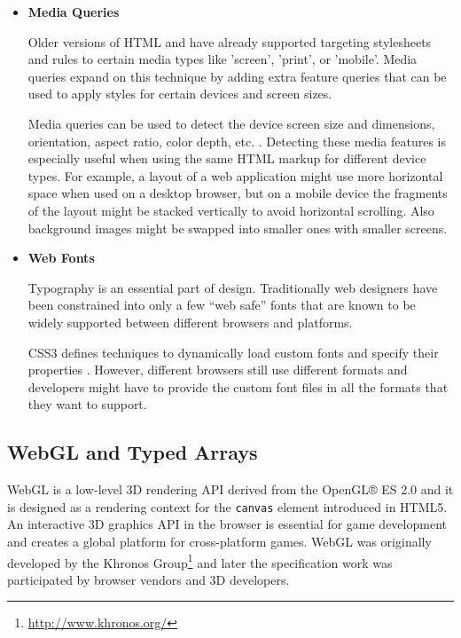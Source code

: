 \begin{itemize}
\item \textbf{Media Queries}

  Older versions of HTML and  have already supported targeting
  stylesheets and rules to certain media types like 'screen', 'print',
  or 'mobile'. Media queries expand on this technique by adding extra
  feature queries that can be used to apply styles for certain devices
  and screen sizes. \cite{mediaqueries}

  Media queries can be used to detect the device screen size and
  dimensions, orientation, aspect ratio, color depth,
  etc. \cite{mediaqueries}. Detecting these media features is especially
  useful when using the same HTML markup for different device types. For
  example, a layout of a web application might use more horizontal space
  when used on a desktop browser, but on a mobile device the fragments
  of the layout might be stacked vertically to avoid horizontal
  scrolling. Also background images might be swapped into smaller ones
  with smaller screens.

\item \textbf{Web Fonts}

  Typography is an essential part of design. Traditionally web designers
  have been constrained into only a few ``web safe'' fonts that are
  known to be widely supported between different browsers and platforms.

  CSS3 defines techniques to dynamically load custom fonts and specify
  their properties \cite{cssfonts}. However, different browsers still
  use different formats and developers might have to provide the custom
  font files in all the formats that they want to support.

\end{itemize}

\subsection{WebGL and Typed Arrays}

WebGL is a low-level 3D rendering API derived from the OpenGL® ES 2.0
\cite{OpenGL} and it is designed as a rendering context for the
\texttt{canvas} element introduced in HTML5. An interactive 3D
graphics API in the browser is essential for game development and
creates a global platform for cross-platform games. WebGL was
originally developed by the Khronos
Group\footnote{\url{http://www.khronos.org/}} and later the
specification work was participated by browser vendors and 3D
developers. \cite{WebGL}

